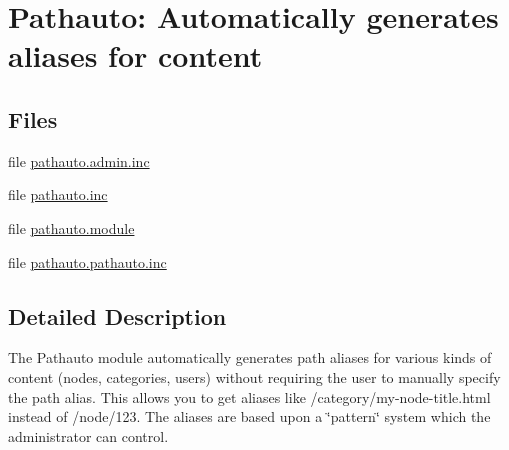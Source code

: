 \hypertarget{group__pathauto}{
\section{Pathauto: Automatically generates aliases for content}
\label{group__pathauto}
}
\subsection*{Files}
\begin{DoxyCompactItemize}
\item 
file \hyperlink{pathauto_8admin_8inc}{pathauto.admin.inc}
\item 
file \hyperlink{pathauto_8inc}{pathauto.inc}
\item 
file \hyperlink{pathauto_8module}{pathauto.module}
\item 
file \hyperlink{pathauto_8pathauto_8inc}{pathauto.pathauto.inc}
\end{DoxyCompactItemize}


\subsection{Detailed Description}
The Pathauto module automatically generates path aliases for various kinds of content (nodes, categories, users) without requiring the user to manually specify the path alias. This allows you to get aliases like /category/my-\/node-\/title.html instead of /node/123. The aliases are based upon a \char`\"{}pattern\char`\"{} system which the administrator can control. 